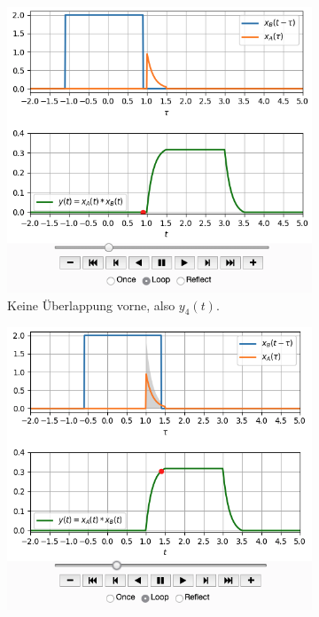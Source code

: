 \documentclass[11pt,a4paper,DIV=12]{scrartcl}
\numberwithin{equation}{section}
\numberwithin{figure}{section}
\begin{document}
\begin{figure}[h!]
\centering
\begin{subfigure}{0.45\textwidth}
\centering
\includegraphics[width=\textwidth]{../convolution_ct/conv_var2_4_AF3B15E0D3.png}
\caption{Keine Überlappung vorne, also $y_4(t)$.}
\label{fig:AF3B15E0D3_v2_4}
\end{subfigure}
\begin{subfigure}{0.45\textwidth}
\centering
\includegraphics[width=\textwidth]{../convolution_ct/conv_var2_1_AF3B15E0D3.png}

\end{subfigure}
\end{figure}
\end{document}
